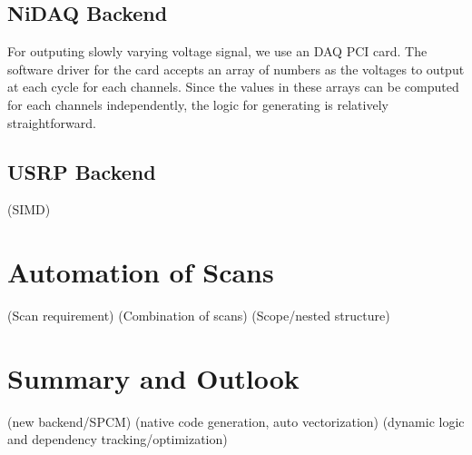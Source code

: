 \subsection{NiDAQ Backend}
For outputing slowly varying voltage signal, we use an DAQ PCI card.
The software driver for the card accepts an array of numbers as the voltages
to output at each cycle for each channels.
Since the values in these arrays can be computed for each channels independently,
the logic for generating is relatively straightforward.


\subsection{USRP Backend}
(SIMD)

\section{Automation of Scans}
\label{ch:computer-control:scan}

(Scan requirement)
(Combination of scans)
(Scope/nested structure)

\section{Summary and Outlook}
\label{ch:computer-control:summary}
(new backend/SPCM)
(native code generation, auto vectorization)
(dynamic logic and dependency tracking/optimization)
